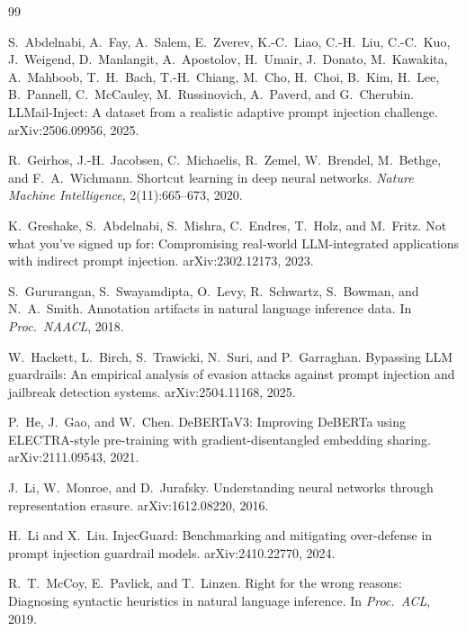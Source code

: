 \documentclass[11pt]{article}
\begin{document}
\FloatBarrier
\clearpage
\begin{thebibliography}{99}

S.~Abdelnabi, A.~Fay, A.~Salem, E.~Zverev, K.-C.~Liao, C.-H.~Liu, C.-C.~Kuo, J.~Weigend, D.~Manlangit, A.~Apostolov, H.~Umair, J.~Donato, M.~Kawakita, A.~Mahboob, T.~H.~Bach, T.-H.~Chiang, M.~Cho, H.~Choi, B.~Kim, H.~Lee, B.~Pannell, C.~McCauley, M.~Russinovich, A.~Paverd, and G.~Cherubin.
\newblock LLMail-Inject: A dataset from a realistic adaptive prompt injection challenge.
\newblock arXiv:2506.09956, 2025.

R.~Geirhos, J.-H.~Jacobsen, C.~Michaelis, R.~Zemel, W.~Brendel, M.~Bethge, and F.~A.~Wichmann.
\newblock Shortcut learning in deep neural networks.
\newblock \emph{Nature Machine Intelligence}, 2(11):665--673, 2020.

K.~Greshake, S.~Abdelnabi, S.~Mishra, C.~Endres, T.~Holz, and M.~Fritz.
\newblock Not what you've signed up for: Compromising real-world LLM-integrated applications with indirect prompt injection.
\newblock arXiv:2302.12173, 2023.

S.~Gururangan, S.~Swayamdipta, O.~Levy, R.~Schwartz, S.~Bowman, and N.~A.~Smith.
\newblock Annotation artifacts in natural language inference data.
\newblock In \emph{Proc.\ NAACL}, 2018.

W.~Hackett, L.~Birch, S.~Trawicki, N.~Suri, and P.~Garraghan.
\newblock Bypassing LLM guardrails: An empirical analysis of evasion attacks against prompt injection and jailbreak detection systems.
\newblock arXiv:2504.11168, 2025.

P.~He, J.~Gao, and W.~Chen.
\newblock DeBERTaV3: Improving DeBERTa using ELECTRA-style pre-training with gradient-disentangled embedding sharing.
\newblock arXiv:2111.09543, 2021.

J.~Li, W.~Monroe, and D.~Jurafsky.
\newblock Understanding neural networks through representation erasure.
\newblock arXiv:1612.08220, 2016.

H.~Li and X.~Liu.
\newblock InjecGuard: Benchmarking and mitigating over-defense in prompt injection guardrail models.
\newblock arXiv:2410.22770, 2024.

R.~T.~McCoy, E.~Pavlick, and T.~Linzen.
\newblock Right for the wrong reasons: Diagnosing syntactic heuristics in natural language inference.
\newblock In \emph{Proc.\ ACL}, 2019.


\end{thebibliography}
\end{document}

